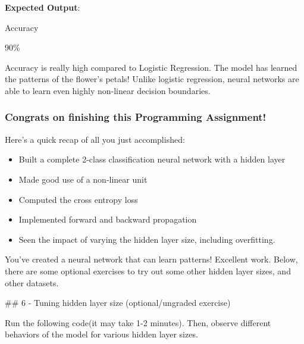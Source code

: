 \documentclass[11pt]{article}
\providecommand{\tightlist}{%
      \setlength{\itemsep}{0pt}\setlength{\parskip}{0pt}}
\begin{document}
    \textbf{Expected Output}:

Accuracy

90\%

    Accuracy is really high compared to Logistic Regression. The model has
learned the patterns of the flower's petals! Unlike logistic regression,
neural networks are able to learn even highly non-linear decision
boundaries.

    \hypertarget{congrats-on-finishing-this-programming-assignment}{%
\subsubsection{Congrats on finishing this Programming
Assignment!}\label{congrats-on-finishing-this-programming-assignment}}

Here's a quick recap of all you just accomplished:

\begin{itemize}
\tightlist
\item
  Built a complete 2-class classification neural network with a hidden
  layer
\item
  Made good use of a non-linear unit
\item
  Computed the cross entropy loss
\item
  Implemented forward and backward propagation
\item
  Seen the impact of varying the hidden layer size, including
  overfitting.
\end{itemize}

You've created a neural network that can learn patterns! Excellent work.
Below, there are some optional exercises to try out some other hidden
layer sizes, and other datasets.

    \#\# 6 - Tuning hidden layer size (optional/ungraded exercise)

Run the following code(it may take 1-2 minutes). Then, observe different
behaviors of the model for various hidden layer sizes.
\end{document}

